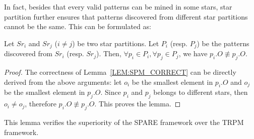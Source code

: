 {In fact, besides that every valid patterns can be
mined in some stars, star partition further ensures
that patterns discovered
from different star partitions cannot be the same. 
This can be formulated as:

\begin{lemma}
\label{LEM:SPM_CORRECT}
Let $Sr_i$ and $Sr_j$ ($i\neq j$) be two star partitions. Let $P_i$ (resp. $P_j$) be 
the patterns discovered from $Sr_i$ (resp. $Sr_j$). 
Then, $\forall p_i \in P_i, \forall p_j \in P_j$, we have $p_i.O \not\equiv p_j.O$.
\end{lemma}
\begin{proof}
The correctness of Lemma~\ref{LEM:SPM_CORRECT} can be directly derived from the above arguments:
let $o_i$ be the smallest element in $p_i.O$ and $o_j$ be the smallest element in $p_j.O$. 
Since $p_i$ and $p_j$ belongs to different stars, then $o_i \neq o_j$, 
therefore $p_i.O \not\equiv p_j.O$. This proves the lemma.
\end{proof}

This lemma verifies the superiority of the SPARE framework over the TRPM framework.
}